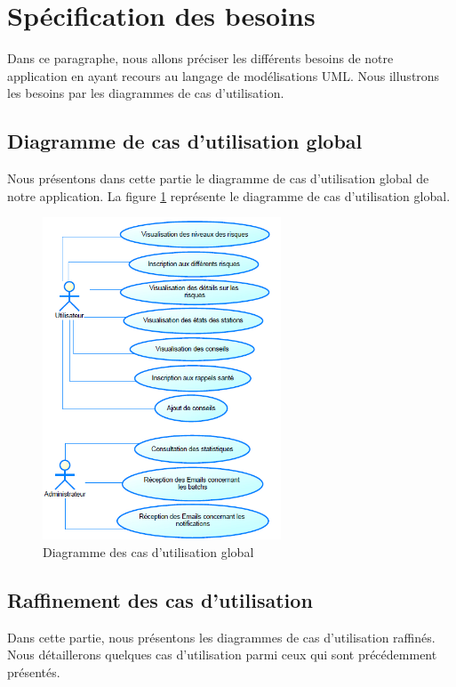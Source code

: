 \section{Spécification des besoins}

\qquad Dans ce paragraphe, nous allons préciser les différents besoins de notre application en ayant recours au langage de modélisations UML. Nous illustrons les besoins par les diagrammes de cas d'utilisation.

\subsection{Diagramme de cas d'utilisation global}

\qquad Nous présentons dans cette partie le diagramme de cas d'utilisation global de notre application. La figure \ref{fig2.1} représente le diagramme de cas d'utilisation global.

\begin{figure}[!h]

	\begin{center}
		\includegraphics[width =7.1cm ]{figures/globalusecase}		
	\end{center}
	\caption{Diagramme des cas d'utilisation global}
	\label{fig2.1}
\end{figure}

\subsection{Raffinement des cas d'utilisation}

\qquad Dans cette partie, nous présentons les diagrammes de cas d'utilisation raffinés. Nous détaillerons quelques cas d'utilisation parmi ceux qui sont précédemment présentés. 

